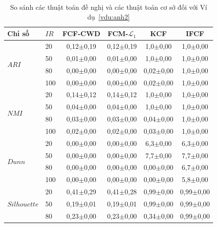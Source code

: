 \documentclass[a4paper,oneside]{book} %
\theoremstyle{plain}
\theoremstyle{plain}
\theoremstyle{nonumberplain}
\begin{document}
\begin{table}\fontsize{11pt}{14pt}\selectfont
	\caption{So sánh các thuật toán đề nghị và các thuật toán cơ sở đối với Ví dụ~\ref{vdu:anh2}}
	\label{tab:EX3_EVA}
	\centering
	\begin{tabular*}{\textwidth}{@{\extracolsep\fill}llcccc@{\extracolsep\fill}}
		\toprule
		\textbf{Chỉ số} & $IR$
		& \textbf{FCF-CWD} & \textbf{FCM}-$\mathcal{L}_1$
		& \textbf{KCF}&  \textbf{IFCF} \\
		\midrule
		\multirow{4}{*}{$ARI$}
		&   20 & 0{,}12$\pm$0{,}19 & 0{,}12$\pm$0{,}19 & 1{,}0$\pm$0{,}00 & 1{,}0$\pm$0{,}00\\
		&   50 & 0{,}01$\pm$0{,}00 & 0{,}01$\pm$0{,}00 & 1{,}0$\pm$0{,}00 & 1{,}0$\pm$0{,}00\\
		&   80 & 0{,}00$\pm$0{,}00 & 0{,}00$\pm$0{,}00 & 0{,}02$\pm$0{,}00 & 1{,}0$\pm$0{,}00\\
		&  100 & 0{,}00$\pm$0{,}00 & 0{,}00$\pm$0{,}00 & 0{,}02$\pm$0{,}00 & 1{,}0$\pm$0{,}00\\
		\midrule
		\multirow{4}{*}{$NMI$}
		&   20 & 0{,}14$\pm$0{,}12 & 0{,}14$\pm$0{,}12 & 1{,}0$\pm$0{,}00 & 1{,}0$\pm$0{,}00\\
		&   50 & 0{,}04$\pm$0{,}00 & 0{,}04$\pm$0{,}00 & 1{,}0$\pm$0{,}00 & 1{,}0$\pm$0{,}00\\
		&   80 & 0{,}03$\pm$0{,}00 & 0{,}03$\pm$0{,}00 & 0{,}04$\pm$0{,}00 & 1{,}0$\pm$0{,}00\\
		&  100 & 0{,}02$\pm$0{,}00 & 0{,}02$\pm$0{,}00 & 0{,}03$\pm$0{,}00 & 1{,}0$\pm$0{,}00\\
		\midrule
		\multirow{4}{*}{$Dunn$}
		&   20 & 0{,}00$\pm$0{,}00 & 0{,}00$\pm$0{,}00 & 6{,}3$\pm$0{,}00 & 6{,}3$\pm$0{,}00\\
		&   50 & 0{,}00$\pm$0{,}00 & 0{,}00$\pm$0{,}00 & 7{,}7$\pm$0{,}00 & 7{,}7$\pm$0{,}00\\
		&   80 & 0{,}00$\pm$0{,}00 & 0{,}00$\pm$0{,}00 & 0{,}00$\pm$0{,}00 & 6{,}7$\pm$0{,}00\\
		&  100 & 0{,}00$\pm$0{,}00 & 0{,}00$\pm$0{,}00 & 0{,}00$\pm$0{,}00 & 5{,}8$\pm$0{,}00\\
		\midrule
		\multirow{4}{*}{$Silhouette$}
		&   20 & 0{,}41$\pm$0{,}29 & 0{,}41$\pm$0{,}28 & 0{,}99$\pm$0{,}00 & 0{,}99$\pm$0{,}00\\
		&   50 & 0{,}19$\pm$0{,}01 & 0{,}19$\pm$0{,}01 & 0{,}99$\pm$0{,}00 & 0{,}99$\pm$0{,}00\\
		&   80 & 0{,}23$\pm$0{,}00 & 0{,}23$\pm$0{,}00 & 0{,}34$\pm$0{,}00 & 0{,}99$\pm$0{,}00\\

\end{tabular*}
\end{table}
\end{document}

